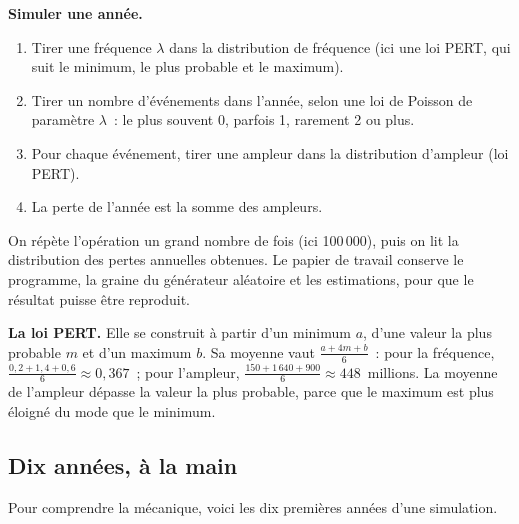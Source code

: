 \begin{boxprocedure}
\textbf{Simuler une année.}
\begin{enumerate}
    \item Tirer une fréquence $\lambda$ dans la distribution de fréquence
          (ici une loi PERT, qui suit le minimum, le plus probable et le
          maximum).
    \item Tirer un nombre d'événements dans l'année, selon une loi de
          Poisson de paramètre $\lambda$~: le plus souvent 0, parfois 1,
          rarement 2 ou plus.
    \item Pour chaque événement, tirer une ampleur dans la distribution
          d'ampleur (loi PERT).
    \item La perte de l'année est la somme des ampleurs.
\end{enumerate}
On répète l'opération un grand nombre de fois (ici 100\,000), puis on lit
la distribution des pertes annuelles obtenues. Le papier de travail
conserve le programme, la graine du générateur aléatoire et les
estimations, pour que le résultat puisse être reproduit.
\end{boxprocedure}

\begin{boxinfo}
\textbf{La loi PERT.} Elle se construit à partir d'un minimum $a$, d'une
valeur la plus probable $m$ et d'un maximum $b$. Sa moyenne vaut
$\frac{a + 4m + b}{6}$~: pour la fréquence,
$\frac{0{,}2 + 1{,}4 + 0{,}6}{6} \approx 0{,}367$~; pour l'ampleur,
$\frac{150 + 1\,640 + 900}{6} \approx 448$~millions. La moyenne de
l'ampleur dépasse la valeur la plus probable, parce que le maximum est plus
éloigné du mode que le minimum.
\end{boxinfo}

\subsection{Dix années, à la main}

Pour comprendre la mécanique, voici les dix premières années d'une
simulation.

